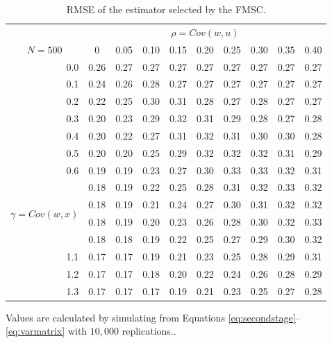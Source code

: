 \documentclass[12pt]{article}
\theoremstyle{definition}
\begin{document}
\begin{table}[!tbp]
\caption{RMSE of the estimator selected by the FMSC.}
\label{tab:rmseFMSC}
\small
 \begin{center}
 \begin{tabular}{r|rrrrrrrrr}\hline\hline
&\multicolumn{9}{c}{$\rho = Cov(w,u)$}\\
\multicolumn{1}{c|}{$N = 500$}&\multicolumn{1}{c}{0}&\multicolumn{1}{c}{0.05}&\multicolumn{1}{c}{0.10}&\multicolumn{1}{c}{0.15}&\multicolumn{1}{c}{0.20}&\multicolumn{1}{c}{0.25}&\multicolumn{1}{c}{0.30}&\multicolumn{1}{c}{0.35}&\multicolumn{1}{c}{0.40}\tabularnewline
\hline
0.0&0.26&0.27&0.27&0.27&0.27&0.27&0.27&0.27&0.27\tabularnewline
0.1&0.24&0.26&0.28&0.27&0.27&0.27&0.27&0.27&0.27\tabularnewline
0.2&0.22&0.25&0.30&0.31&0.28&0.27&0.28&0.27&0.27\tabularnewline
0.3&0.20&0.23&0.29&0.32&0.31&0.29&0.28&0.27&0.28\tabularnewline
0.4&0.20&0.22&0.27&0.31&0.32&0.31&0.30&0.30&0.28\tabularnewline
0.5&0.20&0.20&0.25&0.29&0.32&0.32&0.32&0.31&0.29\tabularnewline
0.6&0.19&0.19&0.23&0.27&0.30&0.33&0.33&0.32&0.31\tabularnewline
\multirow{4}{5mm}{\begin{sideways}\parbox{1mm}{$\gamma\;$=$\;Cov(w,x)$}\end{sideways}}
0.7&0.18&0.19&0.22&0.25&0.28&0.31&0.32&0.33&0.32\tabularnewline
0.8&0.18&0.19&0.21&0.24&0.27&0.30&0.31&0.32&0.32\tabularnewline
0.9&0.18&0.19&0.20&0.23&0.26&0.28&0.30&0.32&0.33\tabularnewline
1.0&0.18&0.18&0.19&0.22&0.25&0.27&0.29&0.30&0.32\tabularnewline
1.1&0.17&0.17&0.19&0.21&0.23&0.25&0.28&0.29&0.31\tabularnewline
1.2&0.17&0.17&0.18&0.20&0.22&0.24&0.26&0.28&0.29\tabularnewline
1.3&0.17&0.17&0.17&0.19&0.21&0.23&0.25&0.27&0.28\tabularnewline
\hline
\end{tabular}
\end{center}
\footnotesize
\begin{tablenotes}
 \item Values are calculated by simulating from Equations \ref{eq:secondstage}--\ref{eq:varmatrix} with $10,000$ replications..
\end{tablenotes}
\end{table}
\end{document}
